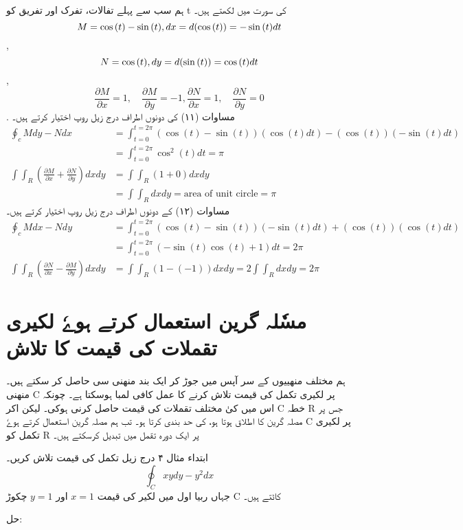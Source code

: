 \documentclass{book}
\begin{document}
\begin{urdufont}
ہم سب سے پہلے تفالات، تفرک اور تفریق کو 
t
کی سورت میں لکھتے ہیں۔
$$ M = \cos{(t)} - \sin{(t)}, \vspace{0.2cm} dx = d(\cos{(t)}) = -\sin{(t)}dt $$,
$$ N = \cos{(t)}, \vspace{0.2cm} dy = d(\sin{(t)}) = \cos{(t)}dt $$,
$$ \frac{\partial M}{\partial x} =1, \quad \frac{\partial M}{\partial y} = -1, \frac{\partial N}{\partial x} =1, \quad \frac{\partial N}{\partial y} = 0 $$.
مساوات
(۱۱) 
کی دونوں اطراف درج زیل روپ اختیار کرتے ہیں۔ 
\begin{align*}
    \oint_c M dy  - N dx &= \int_{t=0}^{t= 2\pi} (\cos{(t)} - \sin{(t)})(\cos{(t)} dt) - (\cos{(t)})(-\sin{(t)} dt) \\
    &= \int_{t=0}^{t= 2\pi} \cos^2{(t)} dt = \pi \\
    \int \int_R (\frac{\partial M}{\partial x} + \frac{\partial N}{\partial y}) dx dy &=  \int \int_R (1 + 0) dx dy \\
    &= \int \int_R dx dy = \text{area of unit circle} = \pi
\end{align*}
مساوات
(۱۲)
کے دونوں اطراف درج زیل روپ اختیار کرتے ہیں۔
\begin{align*}
    \oint_c M dx  - N dy &= \int_{t=0}^{t= 2\pi} (\cos{(t)} - \sin{(t)})(-\sin{(t)} dt) + (\cos{(t)})(\cos{(t)} dt) \\
    &= \int_{t=0}^{t= 2\pi} (-\sin{(t)}\cos{(t)} + 1) dt = 2\pi \\
\int \int_R (\frac{\partial N}{\partial x} - \frac{\partial M}{\partial y}) dx dy &=  \int \int_R (1 - (-1)) dx dy = 2 \int \int_R dx dy = 2\pi
\end{align*}
\section{مسٗلہ گرین استعمال کرتے ہوےٗ لکیری تقملات کی قیمت کا تلاش}
ہم مختلف منھییوں کے سر آپس میں جوڑ کر ایک بند منھنی سی حاصل کر سکتے ہیں۔ منھنی 
C
پر لکیری تکمل کی قیمت تلاش کرنے کا عمل کافی لمبا ہوسکتا ہے۔  چونکہ اس میں کیٰ مختلف تقملات کی قیمت حاصل کرنی ہوکی۔  لیکن اکر 
C
خطہ
R
جس پر مصلہ گرین کا اطلاق ہوتا ہو، کی حد بندی کرتا ہو۔ تب ہم مصلہ گرین استعمال کرتے ہوےٗ 
C
پر لکیری تکمل کو 
R
پر ایک دورہ تقمل میں تبدیل کرسکتے ہیں۔ 

ابتداء مثال
۴
درج زیل تکمل کی قیمت تلاش کریں۔ 
$$ \oint_C xy dy - y^2 dx $$
جہاں ربیا اول میں لکیر
کی قیمت
$x=1$
اور
$y=1$
چکوڑ 
C
کاٹتے ہیں۔

حل:


\end{urdufont}
\end{document}
